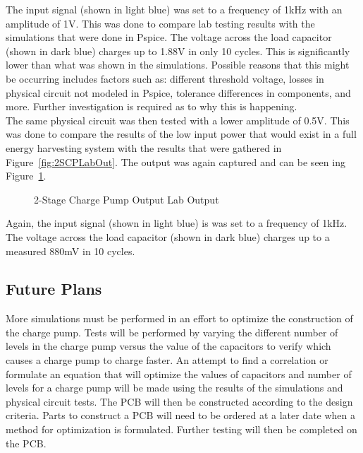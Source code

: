 \documentclass[12pt]{article}
\begin{document}
\noindent The input signal (shown in light blue) was set to a frequency of 1kHz with an amplitude of 1V. This was done to compare lab testing results with the simulations that were done in Pspice. The voltage across the load capacitor (shown in dark blue) charges up to 1.88V in only 10 cycles. This is significantly lower than what was shown in the simulations. Possible reasons that this might be occurring includes factors such as: different threshold voltage, losses in physical circuit not modeled in Pspice, tolerance differences in components, and more. Further investigation is required as to why this is happening.\\

\noindent The same physical circuit was then tested with a lower amplitude of 0.5V. This was done to compare the results of the low input power that would exist in a full energy harvesting system with the results that were gathered in Figure~\ref{fig:2SCPLabOut}. The output was again captured and can be seen ing Figure~\ref{fig:2SCPLabOut2}.

\begin{figure}[H]
\caption{2-Stage Charge Pump Output Lab Output}
\label{fig:2SCPLabOut2}
\end{figure}

Again, the input signal (shown in light blue) is was set to a frequency of 1kHz. The voltage across the load capacitor (shown in dark blue) charges up to a measured 880mV in 10 cycles.

	\subsection{Future Plans}
More simulations must be performed in an effort to optimize the construction of the charge pump. Tests will be performed by varying the different number of levels in the charge pump versus the value of the capacitors to verify which causes a charge pump to charge faster. An attempt to find a correlation or formulate an equation that will optimize the values of capacitors and number of levels for a charge pump will be made using the results of the simulations and physical circuit tests. The PCB will then be constructed according to the design criteria. Parts to construct a PCB will need to be ordered at a later date when a method for optimization is formulated. Further testing will then be completed on the PCB.
	
\end{document}
